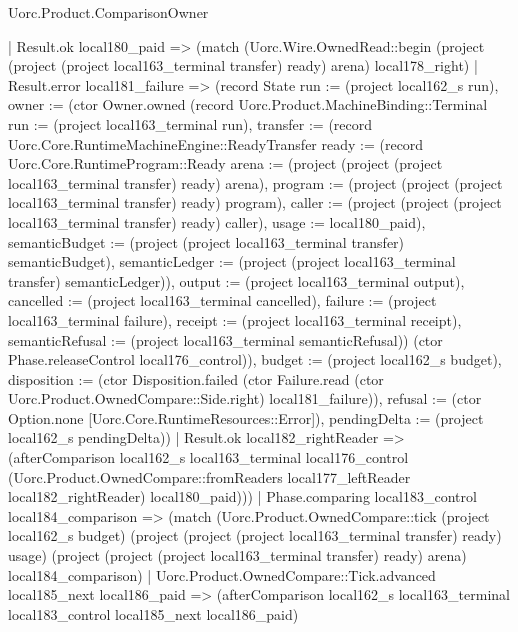\begin{lexlean}{Uorc.Product.ComparisonOwner}
\begin{semanticmodule}
{      | Result.ok local180_paid => (match (Uorc.Wire.OwnedRead::begin (project (project (project local163_terminal transfer) ready) arena) local178_right)
        | Result.error local181_failure => (record State {run := (project local162_s run), owner := (ctor Owner.owned (record Uorc.Product.MachineBinding::Terminal {run := (project local163_terminal run), transfer := (record Uorc.Core.RuntimeMachineEngine::ReadyTransfer {ready := (record Uorc.Core.RuntimeProgram::Ready {arena := (project (project (project local163_terminal transfer) ready) arena), program := (project (project (project local163_terminal transfer) ready) program), caller := (project (project (project local163_terminal transfer) ready) caller), usage := local180_paid}), semanticBudget := (project (project local163_terminal transfer) semanticBudget), semanticLedger := (project (project local163_terminal transfer) semanticLedger)}), output := (project local163_terminal output), cancelled := (project local163_terminal cancelled), failure := (project local163_terminal failure), receipt := (project local163_terminal receipt), semanticRefusal := (project local163_terminal semanticRefusal)}) (ctor Phase.releaseControl local176_control)), budget := (project local162_s budget), disposition := (ctor Disposition.failed (ctor Failure.read (ctor Uorc.Product.OwnedCompare::Side.right) local181_failure)), refusal := (ctor Option.none [Uorc.Core.RuntimeResources::Error]), pendingDelta := (project local162_s pendingDelta)})
        | Result.ok local182_rightReader => (afterComparison local162_s local163_terminal local176_control (Uorc.Product.OwnedCompare::fromReaders local177_leftReader local182_rightReader) local180_paid)))
    | Phase.comparing local183_control local184_comparison => (match (Uorc.Product.OwnedCompare::tick (project local162_s budget) (project (project (project local163_terminal transfer) ready) usage) (project (project (project local163_terminal transfer) ready) arena) local184_comparison)
      | Uorc.Product.OwnedCompare::Tick.advanced local185_next local186_paid => (afterComparison local162_s local163_terminal local183_control local185_next local186_paid)
}
\end{semanticmodule}
\end{lexlean}
